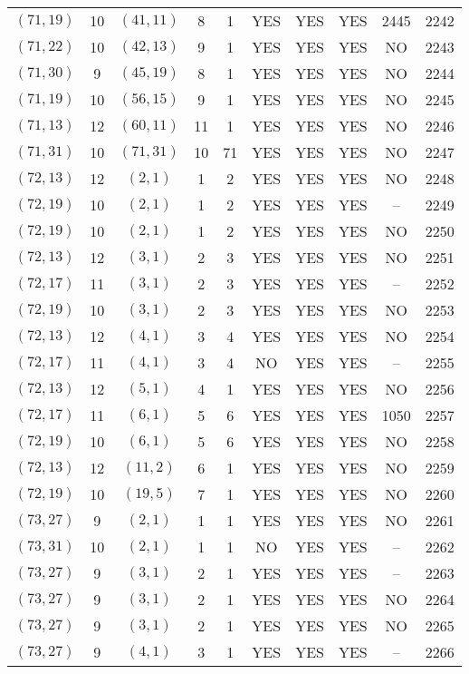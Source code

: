 \begin{longtable}{|c|c|c|c|c|c|c|c|c|c|}
$(71, 19)$ & 10 & $(41, 11)$ & 8 & 1 & YES & YES & YES & 2445 & 2242\\
$(71, 22)$ & 10 & $(42, 13)$ & 9 & 1 & YES & YES & YES & NO & 2243\\
$(71, 30)$ & 9 & $(45, 19)$ & 8 & 1 & YES & YES & YES & NO & 2244\\
$(71, 19)$ & 10 & $(56, 15)$ & 9 & 1 & YES & YES & YES & NO & 2245\\
$(71, 13)$ & 12 & $(60, 11)$ & 11 & 1 & YES & YES & YES & NO & 2246\\
$(71, 31)$ & 10 & $(71, 31)$ & 10 & 71 & YES & YES & YES & NO & 2247\\
$(72, 13)$ & 12 & $(2, 1)$ & 1 & 2 & YES & YES & YES & NO & 2248\\
$(72, 19)$ & 10 & $(2, 1)$ & 1 & 2 & YES & YES & YES & -- & 2249\\
$(72, 19)$ & 10 & $(2, 1)$ & 1 & 2 & YES & YES & YES & NO & 2250\\
$(72, 13)$ & 12 & $(3, 1)$ & 2 & 3 & YES & YES & YES & NO & 2251\\
$(72, 17)$ & 11 & $(3, 1)$ & 2 & 3 & YES & YES & YES & -- & 2252\\
$(72, 19)$ & 10 & $(3, 1)$ & 2 & 3 & YES & YES & YES & NO & 2253\\
$(72, 13)$ & 12 & $(4, 1)$ & 3 & 4 & YES & YES & YES & NO & 2254\\
$(72, 17)$ & 11 & $(4, 1)$ & 3 & 4 & NO & YES & YES & -- & 2255\\
$(72, 13)$ & 12 & $(5, 1)$ & 4 & 1 & YES & YES & YES & NO & 2256\\
$(72, 17)$ & 11 & $(6, 1)$ & 5 & 6 & YES & YES & YES & 1050 & 2257\\
$(72, 19)$ & 10 & $(6, 1)$ & 5 & 6 & YES & YES & YES & NO & 2258\\
$(72, 13)$ & 12 & $(11, 2)$ & 6 & 1 & YES & YES & YES & NO & 2259\\
$(72, 19)$ & 10 & $(19, 5)$ & 7 & 1 & YES & YES & YES & NO & 2260\\
$(73, 27)$ & 9 & $(2, 1)$ & 1 & 1 & YES & YES & YES & NO & 2261\\
$(73, 31)$ & 10 & $(2, 1)$ & 1 & 1 & NO & YES & YES & -- & 2262\\
$(73, 27)$ & 9 & $(3, 1)$ & 2 & 1 & YES & YES & YES & -- & 2263\\
$(73, 27)$ & 9 & $(3, 1)$ & 2 & 1 & YES & YES & YES & NO & 2264\\
$(73, 27)$ & 9 & $(3, 1)$ & 2 & 1 & YES & YES & YES & NO & 2265\\
$(73, 27)$ & 9 & $(4, 1)$ & 3 & 1 & YES & YES & YES & -- & 2266\\

\end{longtable}
